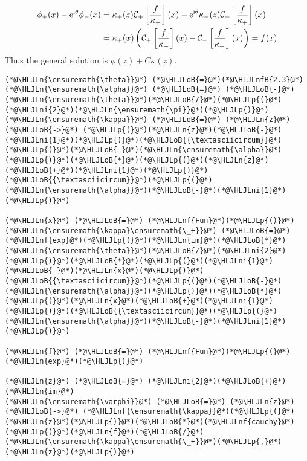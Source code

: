 \documentclass[12pt,landscape]{article}
\newcommand{\HLJLn}[1]{#1}
\newcommand{\HLJLnf}[1]{\textcolor[RGB]{66,102,213}{#1}}
\newcommand{\HLJLnfB}[1]{\textcolor[RGB]{59,151,46}{#1}}
\newcommand{\HLJLni}[1]{\textcolor[RGB]{59,151,46}{#1}}
\newcommand{\HLJLoB}[1]{\textcolor[RGB]{102,102,102}{\textbf{#1}}}
\newcommand{\HLJLp}[1]{#1}
\def\I{ {\rm i} }
\def\E{ {\rm e} }
\def\CC{ {\cal C} }
\def\pr(#1){\left({#1}\right)}
\def\br[#1]{\left[{#1}\right]}
\begin{document}
{\begin{align*}
\phi_+(x) - \E^{\I \theta}\phi_-(x)  & = \kappa_+(z) \CC_+\br[{f \over \kappa_+}](x) -  \E^{\I \theta}\kappa_-(z)\CC_-\br[{f \over \kappa_+}](x)  \\
& = \kappa_+(x)  \pr({\CC_+\br[{f \over \kappa_+}](x) - \CC_-\br[{f \over \kappa_+}](x)  }) = f(x)
\end{align*}
Thus the general solution is $\phi(z) + C \kappa(z)$.


\begin{lstlisting}
(*@\HLJLn{\ensuremath{\theta}}@*) (*@\HLJLoB{=}@*)(*@\HLJLnfB{2.3}@*)
(*@\HLJLn{\ensuremath{\alpha}}@*) (*@\HLJLoB{=}@*) (*@\HLJLoB{-}@*)(*@\HLJLn{\ensuremath{\theta}}@*)(*@\HLJLoB{/}@*)(*@\HLJLp{(}@*)(*@\HLJLni{2}@*)(*@\HLJLn{\ensuremath{\pi}}@*)(*@\HLJLp{)}@*)
(*@\HLJLn{\ensuremath{\kappa}}@*) (*@\HLJLoB{=}@*) (*@\HLJLn{z}@*) (*@\HLJLoB{->}@*) (*@\HLJLp{(}@*)(*@\HLJLn{z}@*)(*@\HLJLoB{-}@*)(*@\HLJLni{1}@*)(*@\HLJLp{)}@*)(*@\HLJLoB{{\textasciicircum}}@*)(*@\HLJLp{(}@*)(*@\HLJLoB{-}@*)(*@\HLJLn{\ensuremath{\alpha}}@*)(*@\HLJLp{)}@*)(*@\HLJLoB{*}@*)(*@\HLJLp{(}@*)(*@\HLJLn{z}@*)(*@\HLJLoB{+}@*)(*@\HLJLni{1}@*)(*@\HLJLp{)}@*)(*@\HLJLoB{{\textasciicircum}}@*)(*@\HLJLp{(}@*)(*@\HLJLn{\ensuremath{\alpha}}@*)(*@\HLJLoB{-}@*)(*@\HLJLni{1}@*)(*@\HLJLp{)}@*)

(*@\HLJLn{x}@*) (*@\HLJLoB{=}@*) (*@\HLJLnf{Fun}@*)(*@\HLJLp{()}@*)
(*@\HLJLn{\ensuremath{\kappa}\ensuremath{\_+}}@*) (*@\HLJLoB{=}@*) (*@\HLJLnf{exp}@*)(*@\HLJLp{(}@*)(*@\HLJLn{im}@*)(*@\HLJLoB{*}@*)(*@\HLJLn{\ensuremath{\theta}}@*)(*@\HLJLoB{/}@*)(*@\HLJLni{2}@*)(*@\HLJLp{)}@*)(*@\HLJLoB{*}@*)(*@\HLJLp{(}@*)(*@\HLJLni{1}@*)(*@\HLJLoB{-}@*)(*@\HLJLn{x}@*)(*@\HLJLp{)}@*)(*@\HLJLoB{{\textasciicircum}}@*)(*@\HLJLp{(}@*)(*@\HLJLoB{-}@*)(*@\HLJLn{\ensuremath{\alpha}}@*)(*@\HLJLp{)}@*)(*@\HLJLoB{*}@*)(*@\HLJLp{(}@*)(*@\HLJLn{x}@*)(*@\HLJLoB{+}@*)(*@\HLJLni{1}@*)(*@\HLJLp{)}@*)(*@\HLJLoB{{\textasciicircum}}@*)(*@\HLJLp{(}@*)(*@\HLJLn{\ensuremath{\alpha}}@*)(*@\HLJLoB{-}@*)(*@\HLJLni{1}@*)(*@\HLJLp{)}@*)

(*@\HLJLn{f}@*) (*@\HLJLoB{=}@*) (*@\HLJLnf{Fun}@*)(*@\HLJLp{(}@*)(*@\HLJLn{exp}@*)(*@\HLJLp{)}@*)

(*@\HLJLn{z}@*) (*@\HLJLoB{=}@*) (*@\HLJLni{2}@*)(*@\HLJLoB{+}@*)(*@\HLJLn{im}@*)
(*@\HLJLn{\ensuremath{\varphi}}@*) (*@\HLJLoB{=}@*) (*@\HLJLn{z}@*) (*@\HLJLoB{->}@*) (*@\HLJLnf{\ensuremath{\kappa}}@*)(*@\HLJLp{(}@*)(*@\HLJLn{z}@*)(*@\HLJLp{)}@*)(*@\HLJLoB{*}@*)(*@\HLJLnf{cauchy}@*)(*@\HLJLp{(}@*)(*@\HLJLn{f}@*)(*@\HLJLoB{/}@*)(*@\HLJLn{\ensuremath{\kappa}\ensuremath{\_+}}@*)(*@\HLJLp{,}@*) (*@\HLJLn{z}@*)(*@\HLJLp{)}@*)


\end{lstlisting}}
\end{document}
